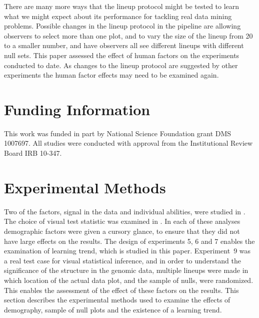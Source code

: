 \documentclass[10pt]{article}\usepackage[]{graphicx}\usepackage[]{xcolor}
\newcommand{\blindDoc}{1}
\begin{document}
There are many more ways that the lineup protocol might be tested to learn what we might expect about its performance for tackling real data mining problems. Possible changes in the lineup protocol in the pipeline are allowing observers to select more than one plot, and to vary the size of the lineup from 20 to a smaller number, and have observers all see different lineups with different null sets.  This paper assessed the effect of human factors on the experiments conducted to date. As changes to the lineup protocol are suggested by other experiments the human factor effects may need to be examined again.

\section{Funding Information}
This work was funded in part by National Science Foundation grant DMS 1007697. All studies were conducted with approval from the Institutional Review Board IRB 10-347.









\appendix


\section{Experimental Methods}\label{sec:exp_design}

Two of the factors, signal in the data and individual abilities, were studied in \cite{majumder:2013}. The choice of visual test statistic was examined in \cite{heike:2012}. In each of these analyses demographic factors were given a cursory glance, to ensure that they did not have large effects on the results. The design of experiments 5, 6 and 7 enables the examination of learning trend, which is studied in this paper. Experiment~9 was a real test case for visual statistical inference, and in order to understand the significance of the structure in the genomic data, multiple lineups were made in which location of the actual data plot, and the sample of nulls, were randomized. This enables the assessment of the effect of these factors on the results. This section describes the experimental methods used to examine the effects of demography, sample of null plots and the existence of a learning trend. 
\end{document}
